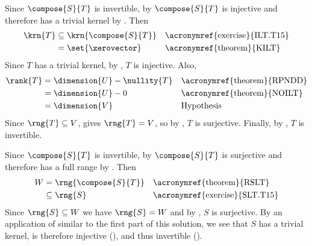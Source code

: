 Since $\compose{S}{T}$ is invertible, by  $\compose{S}{T}$ is injective and therefore has a trivial kernel by .  Then
%
\begin{align*}
\krn{T}
&\subseteq\krn{\compose{S}{T}}&&\text{\acronymref{exercise}{ILT.T15}}\\
&=\set{\zerovector}&&\text{\acronymref{theorem}{KILT}}
\end{align*}
%
Since $T$ has a trivial kernel, by , $T$ is injective.  Also,
%
\begin{align*}
\rank{T}
&=\dimension{U}-\nullity{T}&&\text{\acronymref{theorem}{RPNDD}}\\
&=\dimension{U}-0&&\text{\acronymref{theorem}{NOILT}}\\
&=\dimension{V}&&\text{Hypothesis}
\end{align*}
%
Since $\rng{T}\subseteq V$,  gives $\rng{T}=V$, so by , $T$ is surjective.  Finally, by , $T$ is invertible.\par
%
Since $\compose{S}{T}$ is invertible, by  $\compose{S}{T}$ is surjective and therefore has a full range by .  Then
%
\begin{align*}
W
&=\rng{\compose{S}{T}}&&\text{\acronymref{theorem}{RSLT}}\\
&\subseteq\rng{S}&&\text{\acronymref{exercise}{SLT.T15}}
\end{align*}
%
Since $\rng{S}\subseteq W$ we have $\rng{S}=W$ and by , $S$ is surjective.  By an application of  similar to the first part of this solution, we see that $S$ has a trivial kernel, is therefore injective (), and thus invertible ().